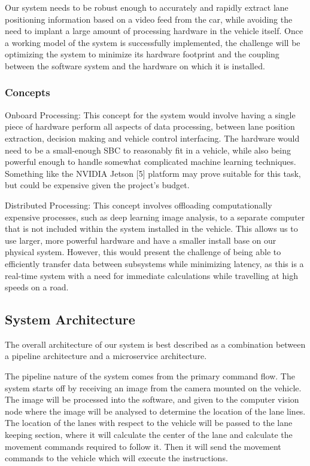 \documentclass[titlepage]{article}
\begin{document}
Our system needs to be robust enough to accurately and rapidly extract lane positioning information based on a video feed from the car, while avoiding the need to implant a large amount of processing hardware in the vehicle itself. Once a working model of the system is successfully implemented, the challenge will be optimizing the system to minimize its hardware footprint and the coupling between the software system and the hardware on which it is installed.

\subsubsection{Concepts}
Onboard Processing: This concept for the system would involve having a single piece of hardware perform all aspects of data processing, between lane position extraction, decision making and vehicle control interfacing. The hardware would need to be a small-enough SBC to reasonably fit in a vehicle, while also being powerful enough to handle somewhat complicated machine learning techniques. Something like the NVIDIA Jetson [5] platform may prove suitable for this task, but could be expensive given the project’s budget.

Distributed Processing: This concept involves offloading computationally expensive processes, such as deep learning image analysis, to a separate computer that is not included within the system installed in the vehicle. This allows us to use larger, more powerful hardware and have a smaller install base on our physical system. However, this would present the challenge of being able to efficiently transfer data between subsystems while minimizing latency, as this is a real-time system with a need for immediate calculations while travelling at high speeds on a road.


\subsection{System Architecture}
The overall architecture of our system is best described as a combination between a pipeline architecture and a microservice architecture.

The pipeline nature of the system comes from the primary command flow. The system starts off by receiving an image from the camera mounted on the vehicle. The image will be processed into the software, and given to the computer vision node where the image will be analysed to determine the location of the lane lines. The location of the lanes with respect to the vehicle will be passed to the lane keeping section, where it will calculate the center of the lane and calculate the movement commands required to follow it. Then it will send the movement commands to the vehicle which will execute the instructions.
\end{document}
